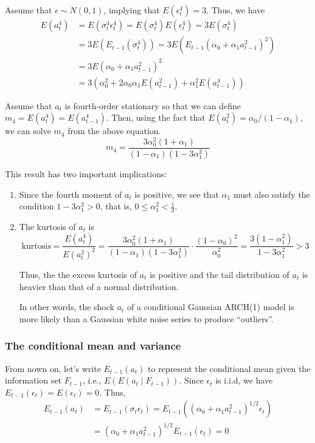 \documentclass[a4paper,11pt]{article}
\begin{document}
Assume that \(\epsilon \sim N(0, 1)\), implying that \(E(\epsilon^4_t) =
3\). Thus, we have
\begin{equation*}
\begin{split}
E(a^4_t) &= E(\sigma^4_t \epsilon_t^4) = E(\sigma^4_t) E(\epsilon^4_t) = 3 E(\sigma^4_t) \\
&= 3 E\left( E_{t-1}(\sigma^4_t) \right) = 3 E\left( E_{t-1}(\alpha_0 + \alpha_1 a^2_{t-1})^2  \right) \\
&= 3 E(\alpha_0 + \alpha_1 a^2_{t-1})^2 \\
&= 3\left(\alpha^2_0 + 2\alpha_0\alpha_1 E(a^2_{t-1}) + \alpha^2_1 E(a^4_{t-1}) \right)
\end{split}
\end{equation*}

Assume that \(a_t\) is fourth-order stationary so that we can define
\(m_4 = E(a^4_t) = E(a^4_{t-1})\). Then, using the fact that \(E(a^2_t) =
\alpha_0 /(1-\alpha_1)\), we can solve \(m_4\) from the
above equation.
\[m_4 = \frac{3\alpha^2_0(1+\alpha_1)}{(1-\alpha_1)(1-3\alpha^2_1)} \]

This result has two important implications: 
\begin{enumerate}
\item Since the fourth moment of \(a_t\) is positive, we see that \(\alpha_1\) must
also satisfy the condition \(1-3\alpha_1^2 > 0\), that is, \(0 \leq
   \alpha^2_1 < \frac{1}{3}\).
\item The kurtosis of \(a_t\) is
\[\text{kurtosis} = \frac{E(a^4_t)}{E(a^2_t)^2} =
   \frac{3\alpha^2_0(1+\alpha_1)}{(1-\alpha_1)(1-3\alpha^2_1)} \cdot
   \frac{(1-\alpha_0)^2}{\alpha_0^2} =
   \frac{3(1-\alpha^2_1)}{1-3\alpha_1^2}  > 3\]

Thus, the the excess kurtosis of \(a_t\) is positive and the tail
distribution of \(a_t\) is heavier than that of a normal
distribution. 

In other words, the shock \(a_t\) of a conditional Gaussian ARCH(1) model
is more likely than a Gaussian white noise series to produce
“outliers”.
\end{enumerate}

\subsubsection*{The conditional mean and variance}
\label{sec:org22a9c6d}

From nown on, let's write \(E_{t-1}(a_t)\) to represent the conditional mean given the
information set \(F_{t-1}\), i.e., \(E(E(a_t \mid F_{t-1}))\). 
Since \(\epsilon_t\) is i.i.d, we have \(E_{t-1}(\epsilon_t) =
E(\epsilon_t) = 0\). Thus,
\begin{equation*}
\begin{split}
E_{t-1}(a_t) &= E_{t-1}(\sigma_t \epsilon_t) = E_{t-1}\left((\alpha_0 + \alpha_1 a^2_{t-1})^{1/2} \epsilon_t\right) \\
&= (\alpha_0 + \alpha_1 a^2_{t-1})^{1/2} E_{t-1}(\epsilon_t) = 0
\end{split}
\end{equation*}
\end{document}
